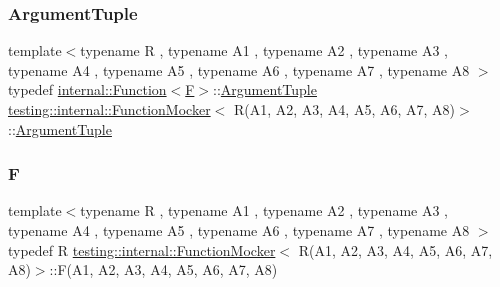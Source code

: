 \subsubsection{\texorpdfstring{ArgumentTuple}{ArgumentTuple}}
{\footnotesize\ttfamily template$<$typename R , typename A1 , typename A2 , typename A3 , typename A4 , typename A5 , typename A6 , typename A7 , typename A8 $>$ \\
typedef \mbox{\hyperlink{structtesting_1_1internal_1_1_function}{internal\+::\+Function}}$<$\mbox{\hyperlink{classtesting_1_1internal_1_1_function_mocker_3_01_r_07_a1_00_01_a2_00_01_a3_00_01_a4_00_01_a5_00_01_a6_00_01_a7_00_01_a8_08_4_ad9749c93b0a17540778c5fa162a5fe6c}{F}}$>$\+::\mbox{\hyperlink{classtesting_1_1internal_1_1_function_mocker_3_01_r_07_a1_00_01_a2_00_01_a3_00_01_a4_00_01_a5_00_01_a6_00_01_a7_00_01_a8_08_4_a57bc2be00815deac8964e2d2ae62fdd2}{Argument\+Tuple}} \mbox{\hyperlink{classtesting_1_1internal_1_1_function_mocker}{testing\+::internal\+::\+Function\+Mocker}}$<$ R(A1, A2, A3, A4, A5, A6, A7, A8)$>$\+::\mbox{\hyperlink{classtesting_1_1internal_1_1_function_mocker_3_01_r_07_a1_00_01_a2_00_01_a3_00_01_a4_00_01_a5_00_01_a6_00_01_a7_00_01_a8_08_4_a57bc2be00815deac8964e2d2ae62fdd2}{Argument\+Tuple}}}

\mbox{\label{classtesting_1_1internal_1_1_function_mocker_3_01_r_07_a1_00_01_a2_00_01_a3_00_01_a4_00_01_a5_00_01_a6_00_01_a7_00_01_a8_08_4_ad9749c93b0a17540778c5fa162a5fe6c}} 
\subsubsection{\texorpdfstring{F}{F}}
{\footnotesize\ttfamily template$<$typename R , typename A1 , typename A2 , typename A3 , typename A4 , typename A5 , typename A6 , typename A7 , typename A8 $>$ \\
typedef R \mbox{\hyperlink{classtesting_1_1internal_1_1_function_mocker}{testing\+::internal\+::\+Function\+Mocker}}$<$ R(A1, A2, A3, A4, A5, A6, A7, A8)$>$\+::F(A1, A2, A3, A4, A5, A6, A7, A8)}



